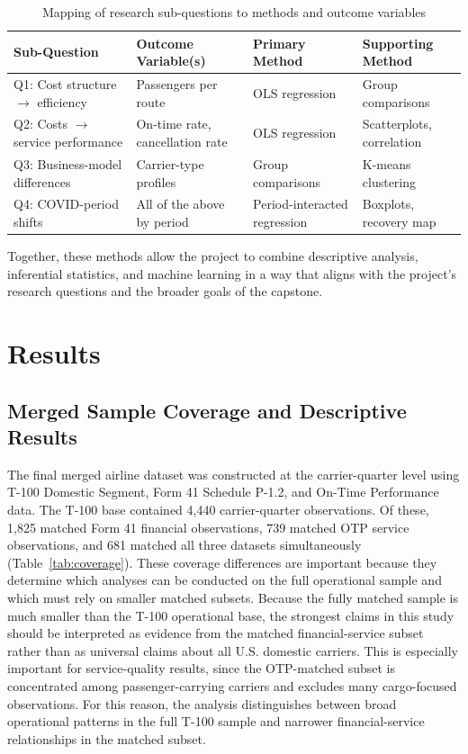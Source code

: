 \documentclass[11pt, letterpaper]{article}
\begin{document}
\begin{table}[H]
\centering
\caption{Mapping of research sub-questions to methods and outcome variables}
\label{tab:methods}
\begin{tabular}{p{3.5cm} p{3.5cm} p{3.5cm} p{3.5cm}}
\toprule
Sub-Question & Outcome Variable(s) & Primary Method & Supporting Method \\
\midrule
Q1: Cost structure $\rightarrow$ efficiency & Passengers per route & OLS regression & Group comparisons \\
Q2: Costs $\rightarrow$ service performance & On-time rate, cancellation rate & OLS regression & Scatterplots, correlation \\
Q3: Business-model differences & Carrier-type profiles & Group comparisons & K-means clustering \\
Q4: COVID-period shifts & All of the above by period & Period-interacted regression & Boxplots, recovery map \\
\bottomrule
\end{tabular}
\end{table}

Together, these methods allow the project to combine descriptive analysis, inferential statistics, and machine learning in a way that aligns with the project's research questions and the broader goals of the capstone.

\section{Results}

\subsection{Merged Sample Coverage and Descriptive Results}
The final merged airline dataset was constructed at the carrier-quarter level using T-100 Domestic Segment, Form 41 Schedule P-1.2, and On-Time Performance data. The T-100 base contained 4,440 carrier-quarter observations. Of these, 1,825 matched Form 41 financial observations, 739 matched OTP service observations, and 681 matched all three datasets simultaneously (Table~\ref{tab:coverage}). These coverage differences are important because they determine which analyses can be conducted on the full operational sample and which must rely on smaller matched subsets. Because the fully matched sample is much smaller than the T-100 operational base, the strongest claims in this study should be interpreted as evidence from the matched financial-service subset rather than as universal claims about all U.S. domestic carriers. This is especially important for service-quality results, since the OTP-matched subset is concentrated among passenger-carrying carriers and excludes many cargo-focused observations. For this reason, the analysis distinguishes between broad operational patterns in the full T-100 sample and narrower financial-service relationships in the matched subset.
\end{document}
